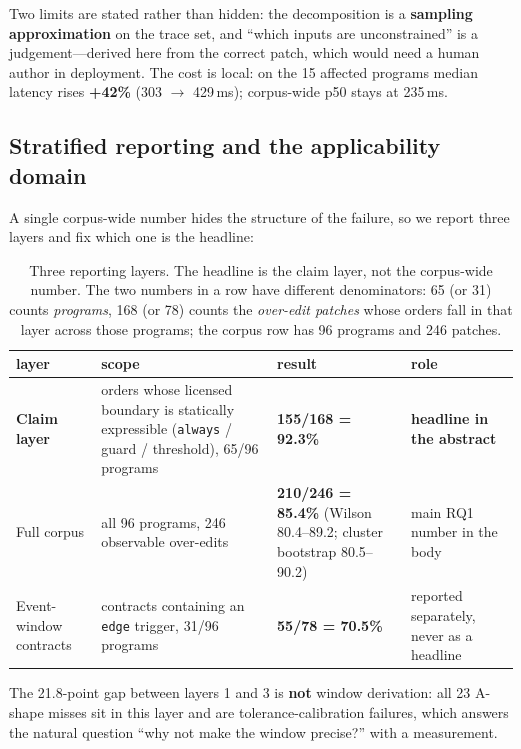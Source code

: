 \documentclass[acmsmall,screen,review,anonymous]{acmart}
\begin{document}
Two limits are stated rather than hidden: the decomposition is a \textbf{sampling approximation} on the trace set, and ``which inputs are unconstrained'' is a judgement---derived here from the correct patch, which would need a human author in deployment. The cost is local: on the 15 affected programs median latency rises \textbf{+42\%} (303 $\to$ 429\,ms); corpus-wide p50 stays at 235\,ms.

\subsection{Stratified reporting and the applicability domain}
\label{sec:layers}

A single corpus-wide number hides the structure of the failure, so we report three layers and fix which one is the headline:

\begin{table}[htbp]
\centering
\small
\setlength{\tabcolsep}{3pt}
\begin{tabular}{@{}p{}p{}p{}p{}@{}}
\toprule
layer & scope & result & role \\
\midrule
\textbf{Claim layer} & orders whose licensed boundary is statically expressible (\texttt{always} / guard / threshold), 65/96 programs & \textbf{155/168 = 92.3\%} & \textbf{headline in the abstract} \\
Full corpus & all 96 programs, 246 observable over-edits & \textbf{210/246 = 85.4\%} (Wilson 80.4--89.2; cluster bootstrap 80.5--90.2) & main RQ1 number in the body \\
Event-window contracts & contracts containing an \texttt{edge} trigger, 31/96 programs & \textbf{55/78 = 70.5\%} & reported separately, never as a headline \\
\bottomrule
\end{tabular}
\caption{Three reporting layers. The headline is the claim layer, not the corpus-wide number. The two numbers in a row have different denominators: 65 (or 31) counts \emph{programs}, 168 (or 78) counts the \emph{over-edit patches} whose orders fall in that layer across those programs; the corpus row has 96 programs and 246 patches.}
\label{tab:layers}
\end{table}

The 21.8-point gap between layers 1 and 3 is \textbf{not} window derivation: all 23 A-shape misses sit in this layer and are tolerance-calibration failures, which answers the natural question ``why not make the window precise?'' with a measurement.
\end{document}

